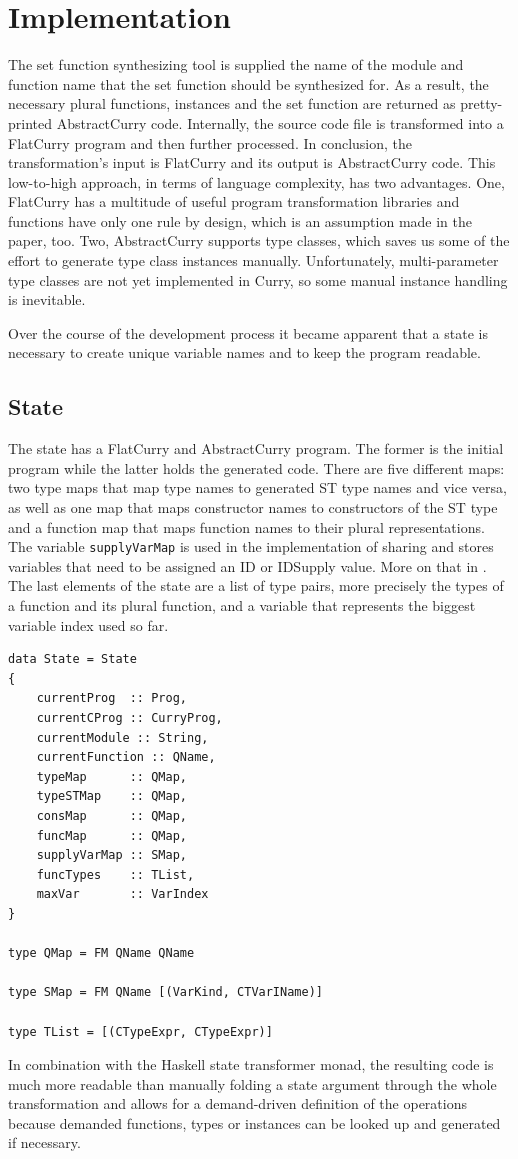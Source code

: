 \documentclass[a4paper, 11pt, fleqn]{scrreprt}
\newcommand{\todo}[1]{\marginpar{\textbf{TODO:} #1}}
\newcommand{\cinline}[1]{\texttt{#1}}
\begin{document}
\chapter{Implementation}
The set function synthesizing tool is supplied the name of the module and function name that the set function should be synthesized for. As a result, the necessary plural functions, instances and the set function are returned as pretty-printed AbstractCurry code. Internally, the source code file is transformed into a FlatCurry program and then further processed. In conclusion, the transformation's input is FlatCurry and its output is AbstractCurry code. This low-to-high approach, in terms of language complexity, has two advantages. One, FlatCurry has a multitude of useful program transformation libraries and functions have only one rule by design, which is an assumption made in the paper, too. Two, AbstractCurry supports type classes, which saves us some of the effort to generate type class instances manually. Unfortunately, multi-parameter type classes are not yet implemented in Curry, so some manual instance handling is inevitable.

Over the course of the development process it became apparent that a state is necessary to create unique variable names and to keep the program readable.

\section{State}
The state has a FlatCurry and AbstractCurry program. The former is the initial program while the latter holds the generated code. There are five different maps: two type maps that map type names to generated ST type names and vice versa, as well as one map that maps constructor names to constructors of the ST type and a function map that maps function names to their plural representations. The variable \cinline{supplyVarMap} is used in the implementation of sharing and stores variables that need to be assigned an ID or IDSupply value. More on that in \todo{link}. The last elements of the state are a list of type pairs, more precisely the types of a function and its plural function, and a variable that represents the biggest variable index used so far.
\begin{verbatim}
data State = State
{
    currentProg  :: Prog,
    currentCProg :: CurryProg,
    currentModule :: String,
    currentFunction :: QName,
    typeMap      :: QMap,
    typeSTMap    :: QMap,
    consMap      :: QMap,
    funcMap      :: QMap,
    supplyVarMap :: SMap,
    funcTypes    :: TList,
    maxVar       :: VarIndex
}

type QMap = FM QName QName

type SMap = FM QName [(VarKind, CTVarIName)]

type TList = [(CTypeExpr, CTypeExpr)]
\end{verbatim}
In combination with the Haskell state transformer monad, the resulting code is much more readable than manually folding a state argument through the whole transformation and allows for a demand-driven definition of the operations because demanded functions, types or instances can be looked up and generated if necessary.
\end{document}
